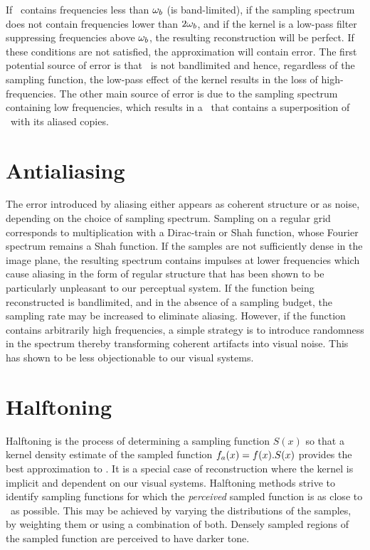 \documentclass[11pt,fleqn]{book} %
\newcommand{\TBC} {\vspace {1em} \noindent [TO BE COMPLETED IN THE FINAL VERSION.] \vspace {1em}}
\begin{document}
If \ifn\ contains frequencies less than $\omega_b$ (is band-limited), if the sampling spectrum does not contain frequencies lower than $2\omega_b$, and if the kernel is a low-pass filter suppressing frequencies above $\omega_b$, the resulting reconstruction will be perfect. If these conditions are not satisfied, the approximation will contain error. The first potential source of error is that \ifn\ is not bandlimited and hence, regardless of the sampling function, the low-pass effect of the kernel results in the loss of high-frequencies. The other main source of error is due to the sampling spectrum containing low frequencies, which results in a \FTsym{\appr{\ifsym}}\ that contains a superposition of \IFn\ with its aliased copies.

\section{Antialiasing}
The error introduced by aliasing either appears as coherent structure or as noise, depending on the choice of sampling spectrum. Sampling on a regular grid corresponds to multiplication with a Dirac-train or Shah function, whose Fourier spectrum remains a Shah function. If the samples are not sufficiently dense in the image plane, the resulting spectrum contains impulses at lower frequencies which cause aliasing in the form of regular structure that has been shown to be particularly unpleasant to our perceptual system. If the function being reconstructed is bandlimited, and in the absence of a sampling budget, the sampling rate may be increased to eliminate aliasing. However, if the function contains arbitrarily high frequencies, a simple strategy is to introduce randomness in the spectrum thereby transforming coherent artifacts into visual noise. This has shown to be less objectionable to our visual systems.

\TBC

\section{Halftoning}
Halftoning is the process of determining a sampling function $S(x)$ so that a kernel density estimate of the sampled function ${f}_a(x) = f(x).S(x)$ provides the best approximation to \ifn. It is a special case of reconstruction where the kernel is implicit and dependent on our visual systems. Halftoning methods strive to identify sampling functions for which the \textit{perceived} sampled function is as close to \ifn\ as possible. This may be achieved by varying the distributions of the samples, by weighting them or using a combination of both. Densely sampled regions of the sampled function are perceived to have darker tone. 
\end{document}
